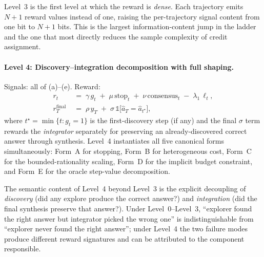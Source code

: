 Level~3 is the first level at which the reward is \emph{dense}. Each trajectory emits $N+1$ reward values instead of one, raising the per-trajectory signal content from one bit to $N+1$ bits. This is the largest information-content jump in the ladder and the one that most directly reduces the sample complexity of credit assignment.

\paragraph{Level 4: Discovery--integration decomposition with full shaping.}
Signals: all of (a)--(e). Reward:
\begin{equation}
\begin{aligned}
r_t &\;=\; \gamma\,g_t \;+\; \mu\,\mathrm{stop}_t \;+\; \nu\,\mathrm{consensus}_t \;-\; \lambda_1\,\ell_t, \\
r_T^{\mathrm{final}} &\;=\; \rho\,y_T \;+\; \sigma\,\mathbb{1}\bigl[\hat a_T = \hat a_{t^\star}\bigr],
\end{aligned}
\label{eq:reward-level4}
\end{equation}
where $t^\star = \min\{t : g_t = 1\}$ is the first-discovery step (if any) and the final $\sigma$ term rewards the \emph{integrator} separately for preserving an already-discovered correct answer through synthesis. Level~4 instantiates all five canonical forms simultaneously: Form~A for stopping, Form~B for heterogeneous cost, Form~C for the bounded-rationality scaling, Form~D for the implicit budget constraint, and Form~E for the oracle step-value decomposition.

The semantic content of Level~4 beyond Level~3 is the explicit decoupling of \emph{discovery} (did any explore produce the correct answer?) and \emph{integration} (did the final synthesis preserve that answer?). Under Level~0--Level~3, ``explorer found the right answer but integrator picked the wrong one'' is indistinguishable from ``explorer never found the right answer''; under Level~4 the two failure modes produce different reward signatures and can be attributed to the component responsible.

